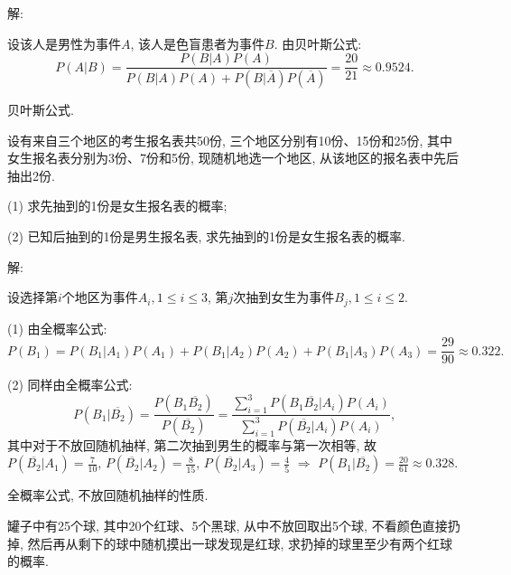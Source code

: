 \documentclass[standard]{ExBook}
\begin{document}
\begin{qitems}
\vspace{-5em}

    \begin{bbox}
解: 

设该人是男性为事件$A$, 该人是色盲患者为事件$B$. 由贝叶斯公式:
$$P(A|B)=\frac{P(B|A)P(A)}{P(B|A)P(A)+P(B|\overline{A})P(\overline{A})}=\frac{20}{21}\approx0.9524.$$

\textcolor{themeColor}{\selectfont {} 贝叶斯公式.}
    \end{bbox}

\vspace{-5em}

    \begin{bbox}
    \begin{shaded}
        \qitem
设有来自三个地区的考生报名表共50份, 三个地区分别有10份、15份和25份, 其中女生报名表分别为3份、7份和5份, 现随机地选一个地区, 从该地区的报名表中先后抽出2份.

(1) 求先抽到的1份是女生报名表的概率;

(2) 已知后抽到的1份是男生报名表, 求先抽到的1份是女生报名表的概率.
    \end{shaded}
    \end{bbox}

\vspace{-5em}

    \begin{bbox}
解: 

设选择第$i$个地区为事件$A_{i},1 \leq i \leq 3$, 第$j$次抽到女生为事件$B_{j},1 \leq i \leq 2$.

(1) 由全概率公式:
$$P(B_{1})=P(B_{1}|A_{1})P(A_{1})+P(B_{1}|A_{2})P(A_{2})+P(B_{1}|A_{3})P(A_{3})=\frac{29}{90}\approx0.322.$$

(2) 同样由全概率公式:
$$P(B_{1}|\overline{B_{2}})=\frac{P(B_{1}\overline{B_{2}})}{P(\overline{B_{2}})}=\frac{\sum\limits_{i=1}^{3}P(B_{1}\overline{B_{2}}|A_{i})P(A_{i})}{\sum\limits_{i=1}^{3}P(\overline{B_{2}}|A_{i})P(A_{i})},$$
其中对于不放回随机抽样, 第二次抽到男生的概率与第一次相等, 故$P(\overline{B_{2}}|A_{1})=\frac{7}{10}$, $P(\overline{B_{2}}|A_{2})=\frac{8}{15}$, $P(\overline{B_{2}}|A_{3})=\frac{4}{5}$ $\Longrightarrow$ $P(B_{1}|\overline{B_{2}})=\frac{20}{61}\approx0.328$.

\textcolor{themeColor}{\selectfont {} 全概率公式, 不放回随机抽样的性质.}
    \end{bbox}

\vspace{-5em}

    \begin{bbox}
    \begin{shaded}
        \qitem
罐子中有25个球, 其中20个红球、5个黑球, 从中不放回取出5个球, 不看颜色直接扔掉, 然后再从剩下的球中随机摸出一球发现是红球, 求扔掉的球里至少有两个红球的概率.
    \end{shaded}
    \end{bbox}


\end{qitems}
\end{document}
